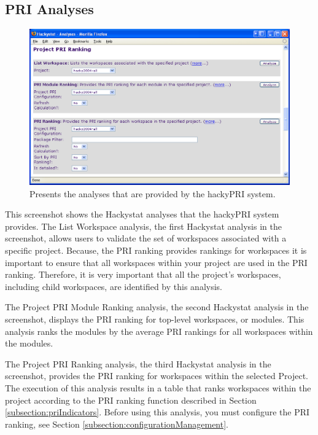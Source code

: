 \subsection{PRI Analyses}
\begin{figure}[htbp]
  \centering
  \includegraphics[width=1.00\textwidth]{figs/UserInterface/section-projectPriRanking.eps}
  \caption[PRI analyses]{Presents the analyses that are provided by the
    hackyPRI system.}
  \label{fig:section-projectPriRanking}
\end{figure}
This screenshot shows the Hackystat analyses that the hackyPRI system
provides. The List Workspace analysis, the first Hackystat analysis in the
screenshot, allows users to validate the set of workspaces associated with
a specific project. Because, the PRI ranking provides rankings for
workspaces it is important to ensure that all workspaces within your
project are used in the PRI ranking. Therefore, it is very important that
all the project's workspaces, including child workspaces, are identified
by this analysis.

The Project PRI Module Ranking analysis, the second Hackystat analysis in
the screenshot, displays the PRI ranking for top-level workspaces, or
modules. This analysis ranks the modules by the average PRI rankings for
all workspaces within the modules. 

The Project PRI Ranking analysis, the third Hackystat analysis in the
screenshot, provides the PRI ranking for workspaces within the selected
Project. The execution of this analysis results in a table that ranks
workspaces within the project according to the PRI ranking function
described in Section \ref{subsection:priIndicators}. Before using this
analysis, you must configure the PRI ranking, see Section
\ref{subsection:configurationManagement}.



